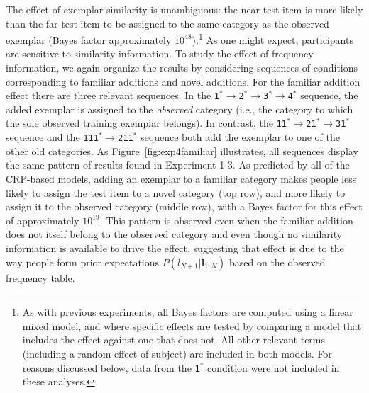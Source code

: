\documentclass[doc]{apa6}
\newcommand{\dist}[1]{\texttt{#1}}
\newcommand{\goesto}{$\rightarrow$}
\begin{document}
The effect of exemplar similarity is unambiguous: the near test item is more likely than the far test item to be assigned to the same category as the observed exemplar (Bayes factor approximately $10^{48}$).\footnote{As with previous experiments, all Bayes factors are computed using a linear mixed model, and where specific effects are tested by comparing a model that includes the effect against one that does not. All other relevant terms (including a random effect of subject) are included in both models. For reasons discussed below, data from the \dist{1$^*$} condition were not included in these analyses.} As one might expect, participants are sensitive to similarity information. To study the effect of frequency information, we again organize the results by considering sequences of conditions corresponding to familiar additions and novel additions. For the familiar addition effect there are three relevant sequences. In the \dist{1$^*$}\goesto\dist{2$^*$}\goesto\dist{3$^*$}\goesto\dist{4$^*$} sequence, the added exemplar is assigned to the {\it observed} category (i.e., the category to which the sole observed training exemplar belongs). In contrast, the \dist{11$^*$}\goesto\dist{21$^*$}\goesto\dist{31$^*$} sequence and the \dist{111$^*$}\goesto\dist{211$^*$} sequence both add the exemplar to one of the other old categories. As Figure~\ref{fig:exp4familiar} illustrates, all sequences display the same pattern of results found in Experiment 1-3. As predicted by all of the CRP-based models, adding an exemplar to a familiar category makes people less likely to assign the test item to a novel category (top row), and more likely to assign it to the observed category (middle row), with a Bayes factor for this effect of approximately $10^{19}$. This pattern is observed even when the familiar addition does not itself belong to the observed category and even though no similarity information is available to drive the effect, suggesting that effect is due to the way people form prior expectations $P(l_{N+1} | \bm{l}_{1:N})$ based on the observed frequency table.
\end{document}
